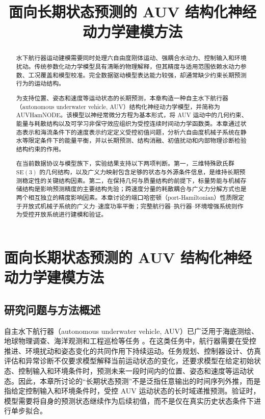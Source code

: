 \documentclass[UTF8,zihao=-4]{ctexrep}
\title{面向长期状态预测的 AUV 结构化神经动力学建模方法}
\author{}
\date{}
\newcommand{\SE}{\mathrm{SE}}
\begin{document}
\maketitle

\begin{abstract}
水下航行器运动建模需要同时处理六自由度刚体运动、强耦合水动力、控制输入和环境扰动。传统参数化动力学模型具有清晰的物理解释，但其精度与适用范围依赖水动力参数、工况覆盖和模型校准。完全数据驱动模型表达能力较强，却通常缺少约束长期预测行为的运动结构。

为支持位置、姿态和速度等运动状态的长期预测，本章构造一种自主水下航行器（autonomous underwater vehicle, AUV）结构化神经动力学模型，并简称为 AUVHamNODE。该模型以神经常微分方程为基本形式，将 AUV 运动中的几何约束、能量与耗散结构以及可学习非保守效应组织为受控连续时间动力学函数类。本章通过状态表示和海流条件下的速度表示约定定义受控初值问题，分析六自由度机械子系统在静水等限定条件下的能量平衡，并以长期预测、结构消融、初值扰动和内部物理诊断检验结构约束的作用。

在当前数据协议与模型族下，实验结果支持以下两项判断。第一，三维特殊欧氏群 \(\SE(3)\) 的几何结构，以及广义力映射包含足够的状态与外源条件信息，是维持长期预测稳定性的关键结构因素。第二，在保持几何与质量结构的前提下，标量势能与机械存储结构是影响预测精度的主要结构先验；跨速度分量的耗散耦合与广义力分解方式也是两个相互独立的精度影响因素。本章讨论的端口哈密顿（port-Hamiltonian）性质限定于开放式机械子系统的广义力--速度功率平衡；完整航行器--执行器--环境增强系统则作为受控开放系统进行建模和验证。
\end{abstract}

\tableofcontents

\chapter{面向长期状态预测的 AUV 结构化神经动力学建模方法}

\section{研究问题与方法概述}

自主水下航行器（autonomous underwater vehicle, AUV）已广泛用于海底测绘、地球物理调查、海洋观测和工程巡检等任务 \citep{wynn2014auvgeoscience,sahoo2019advancements}。在这类任务中，航行器需要在受控推进、环境扰动和姿态变化的共同作用下持续运动。任务规划、控制器设计、仿真评估和异常诊断不仅要求模型解释当前运动状态的变化，还要求模型在给定初始状态、控制输入和环境条件时，预测未来一段时间内的位置、姿态和速度等运动状态。因此，本章所讨论的“长期状态预测”不是泛指任意输出的时间序列外推，而是指给定控制输入和环境条件时，受控 AUV 运动状态的长时域递推预测。验证时，模型需要将自身的预测状态继续作为后续初值，而不是仅在真实历史状态条件下进行单步拟合。
\end{document}
